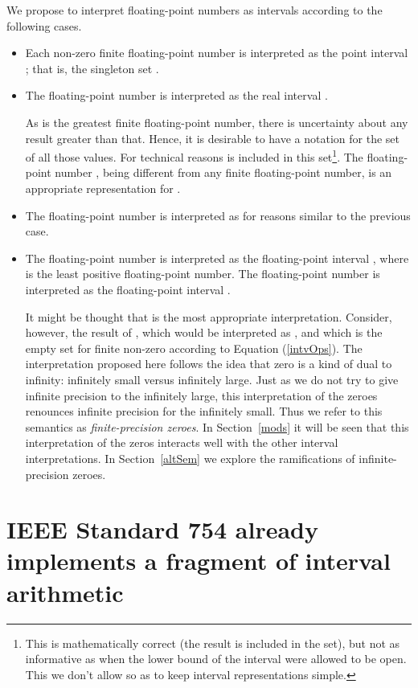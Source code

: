 \documentclass[11pt]{article}
\begin{document}
We propose to interpret floating-point numbers as intervals according
to the following cases.
\begin{itemize}

\item Each non-zero finite floating-point number  is interpreted as
  the point interval ; that is, the singleton set
  .

\item The floating-point number  is interpreted as the real
  interval .

  As  is the greatest finite floating-point number, there is
  uncertainty about any result greater than that.  Hence, it is
  desirable to have a notation for the set of all those values. For
  technical reasons  is included in this set\footnote{
This is mathematically correct (the result is included in the set),
but not as informative as when the lower bound of the interval were
allowed to be open. This we don't allow so as to keep interval
representations simple.}.
The floating-point
  number , being different from any finite floating-point
  number, is an appropriate representation for .

\item The floating-point number  is interpreted as
   for reasons similar to the previous case.

\item The floating-point number  is interpreted as the
  floating-point interval , where  is the least positive
  floating-point number.  The floating-point number  is
  interpreted as the floating-point interval .

  It might be thought that  is the most appropriate
  interpretation. Consider, however, the result of , which would
  be interpreted as , and which is the empty set for
  finite non-zero  according to Equation (\ref{intvOps}).  The
  interpretation proposed here follows the idea that zero is a kind of
  dual to infinity: infinitely small versus infinitely large. Just as
  we do not try to give infinite precision to the infinitely large,
  this interpretation of the zeroes renounces infinite precision for
  the infinitely small. Thus we refer to this semantics as
  \emph{finite-precision zeroes}.  In Section~\ref{mods} it will be
  seen that this interpretation of the zeros interacts well with the
  other interval interpretations.  In Section~\ref{altSem} we explore
  the ramifications of infinite-precision zeroes.
\end{itemize}

\section{IEEE Standard 754 already implements a fragment of interval
  arithmetic}
\label{fragmIA}
\end{document}
